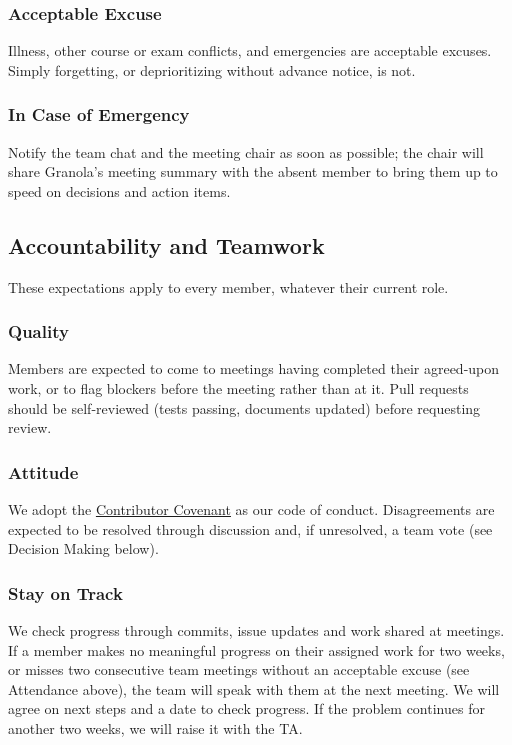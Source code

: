 \documentclass{article}
\begin{document}
\subsubsection*{Acceptable Excuse}

Illness, other course or exam conflicts, and emergencies are acceptable
excuses. Simply forgetting, or deprioritizing without advance notice, is
not.

\subsubsection*{In Case of Emergency}

Notify the team chat and the meeting chair as soon as possible; the chair
will share Granola's meeting summary with the absent member to bring them
up to speed on decisions and action items.

\subsection*{Accountability and Teamwork}

These expectations apply to every member, whatever their current role.

\subsubsection*{Quality}

Members are expected to come to meetings having completed their agreed-upon
work, or to flag blockers before the meeting rather than at it. Pull
requests should be self-reviewed (tests passing, documents updated) before
requesting review.

\subsubsection*{Attitude}

We adopt the
\href{https://www.contributor-covenant.org/}{Contributor Covenant} as our
code of conduct. Disagreements are expected to be resolved through
discussion and, if unresolved, a team vote (see Decision Making below).

\subsubsection*{Stay on Track}

We check progress through commits, issue updates and work shared at
meetings. If a member makes no meaningful progress on their assigned work
for two weeks, or misses two consecutive team meetings without an
acceptable excuse (see Attendance above), the team will speak with them at
the next meeting. We will agree on next steps and a date to check progress.
If the problem continues for another two weeks, we will raise it with the
TA.
\end{document}
